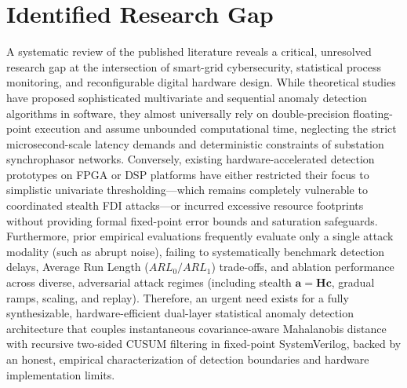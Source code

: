 \documentclass[12pt,a4paper]{report}
\begin{document}
\section{Identified Research Gap}
A systematic review of the published literature reveals a critical, unresolved research gap
at the intersection of smart-grid cybersecurity, statistical process monitoring, and reconfigurable
digital hardware design. While theoretical studies have proposed sophisticated multivariate and
sequential anomaly detection algorithms in software, they almost universally rely on double-precision
floating-point execution and assume unbounded computational time, neglecting the strict microsecond-scale
latency demands and deterministic constraints of substation synchrophasor networks. Conversely,
existing hardware-accelerated detection prototypes on FPGA or DSP platforms have either restricted
their focus to simplistic univariate thresholding—which remains completely vulnerable to coordinated
stealth FDI attacks—or incurred excessive resource footprints without providing formal fixed-point
error bounds and saturation safeguards. Furthermore, prior empirical evaluations frequently evaluate
only a single attack modality (such as abrupt noise), failing to systematically benchmark detection
delays, Average Run Length ($ARL_0/ARL_1$) trade-offs, and ablation performance across diverse,
adversarial attack regimes (including stealth $\boldsymbol{a} = \boldsymbol{H}\boldsymbol{c}$, gradual
ramps, scaling, and replay). Therefore, an urgent need exists for a fully synthesizable,
hardware-efficient dual-layer statistical anomaly detection architecture that couples instantaneous
covariance-aware Mahalanobis distance with recursive two-sided CUSUM filtering in fixed-point
SystemVerilog, backed by an honest, empirical characterization of detection boundaries and hardware
implementation limits.
\end{document}
